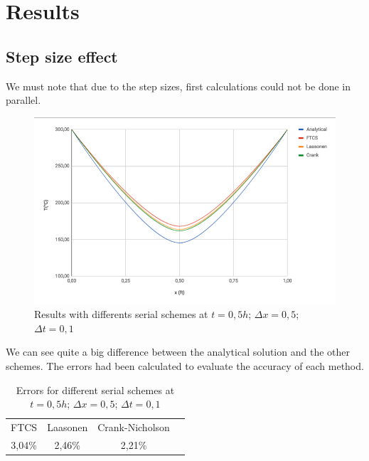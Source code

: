 \documentclass{article}
\begin{document}
        \section{Results}
            \subsection{Step size effect}

                We must note that due to the step sizes, first calculations could not be done in parallel.
                \begin{figure}[H]
                    \includegraphics[width=\textwidth]{step_size_1.png}
                    \caption{Results with differents serial schemes at $t = 0,5h$; $\Delta x=0,5$; $\Delta t=0,1$}
                \end{figure}

                We can see quite a big difference between the analytical solution and the other schemes. The errors had been calculated 
                to evaluate the accuracy of each method.

                \begin{table}[H]
                    \centering
                    \caption{Errors for different serial schemes at $t = 0,5h$; $\Delta x=0,5$; $\Delta t=0,1$}
                    \begin{tabular}{|c|c|c|l}
                    \cline{1-3}
                    FTCS     & Laasonen & Crank-Nicholson &  \\ \cline{1-3}
                    3,04\%   & 2,46\%   & 2,21\%          &  \\ \cline{1-3}
                    \end{tabular}
                    
                \end{table}
\end{document}

